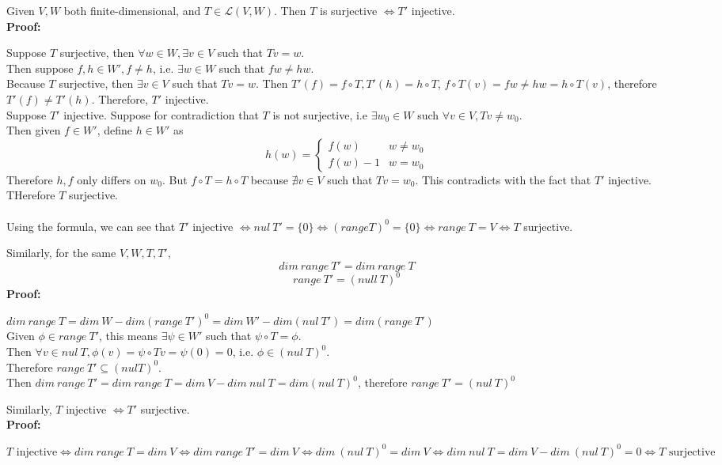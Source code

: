 \documentclass{article}
\begin{document}
Given $V, W$ both finite-dimensional, and $T \in \mathcal{L}(V, W)$. Then $T$ is surjective $\iff T'$ injective.\\
\textbf{Proof:}
\begin{addmargin}[1em]{0em}
Suppose $T$ surjective, then $\forall w \in W, \exists v \in V$ such that $Tv = w$.\\
Then suppose $f, h \in W', f \neq h$, i.e. $\exists w \in W$ such that $fw \neq hw$.\\
Because $T$ surjective, then $\exists v \in V$ such that $Tv = w$. Then $T'(f) = f \circ T, T'(h) = h \circ T$, $f \circ T(v) = fw \neq hw = h \circ T(v)$, therefore $T'(f) \neq T'(h)$. Therefore, $T'$ injective.\\
Suppose $T'$ injective. Suppose for contradiction that $T$ is not surjective, i.e $\exists w_0 \in W$ such $\forall v \in V, Tv \neq w_0$.\\
Then given $f \in W'$, define $h \in W'$ as
\begin{equation*}
    h(w) = \begin{cases}
    f(w) & w \neq w_0\\
    f(w) - 1 & w = w_0
    \end{cases}
\end{equation*}
Therefore $h, f$ only differs on $w_0$. But $f \circ T = h \circ T$ because $\nexists v \in V$ such that $Tv = w_0$. This contradicts with the fact that $T'$ injective.\\
THerefore $T$ surjective.\\\\
Using the formula, we can see that $T'$ injective $\iff nul\ T' = \{0\} \iff (range T)^0 = \{0\} \iff range\ T = V \iff T$ surjective.
\end{addmargin}
Similarly, for the same $V, W, T, T'$,
\begin{equation*}
    dim\ range\ T' = dim\ range\ T
\end{equation*}
\begin{equation*}
    range\ T' = (null\ T)^0
\end{equation*}
\textbf{Proof:}
\begin{addmargin}[1em]{0em}
$dim\ range\ T = dim\ W - dim(range\ T')^0 = dim\ W' - dim(nul\ T') = dim(range\ T')$\\
Given $\phi \in range\ T'$, this means $\exists \psi \in W'$ such that $\psi \circ T = \phi$.\\
Then $\forall v \in nul\ T, \phi(v) = \psi \circ Tv = \psi(0) = 0$, i.e. $\phi \in (nul\ T)^0$.\\
Therefore $range\ T' \subseteq (nul T)^0$.\\
Then $dim\ range\ T' = dim\ range\ T = dim\ V - dim\ nul\ T = dim(nul\ T)^0$, therefore $range\ T' = (nul\ T)^0$
\end{addmargin}
Similarly, $T$ injective $\iff T'$ surjective.\\
\textbf{Proof:}
\begin{addmargin}[1em]{0em}
$T \textrm{ injective} \iff dim\ range\ T = dim\ V \iff dim\ range\ T' = dim\ V \iff dim\ (nul\ T)^0 = dim\ V \iff dim\ nul\ T = dim\ V - dim\ (nul\ T)^0 = 0 \iff T \textrm{ surjective}$
\end{addmargin}
\end{document}
